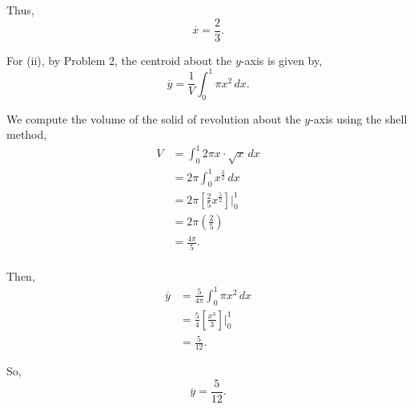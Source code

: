 \documentclass[../hw7.tex]{subfiles}
\begin{document}
Thus, \[\overline{x}=\frac{2}{3}.\]

For (ii), by Problem 2, the centroid about the $y$-axis is given by,
\[\overline{y}=\frac{1}{V}\int_{0}^{1} \pi x^2\,dx.\]

We compute the volume of the solid of revolution about the $y$-axis using the shell method,
\begin{align*}
    V&=\int_{0}^{1} 2\pi x \cdot \sqrt{x}\,dx \\
    &= 2\pi \int_{0}^{1} x^{\frac{3}{2}}\,dx \\
    &= 2\pi \left[ \frac{2}{5} x^{\frac{5}{2}} \right] \Bigg\vert_{0}^{1} \\
    &= 2\pi \left( \frac{2}{5} \right) \\
    &= \frac{4\pi}{5}. \\
\end{align*}

Then,
\begin{align*}
    \overline{y}&=\frac{5}{4\pi} \int_{0}^{1} \pi x^2\,dx \\
    &= \frac{5}{4} \left[ \frac{x^3}{3} \right] \Bigg\vert_{0}^{1} \\
    &= \frac{5}{12}.
\end{align*}

So, \[\overline{y}=\frac{5}{12}.\]
\end{document}
